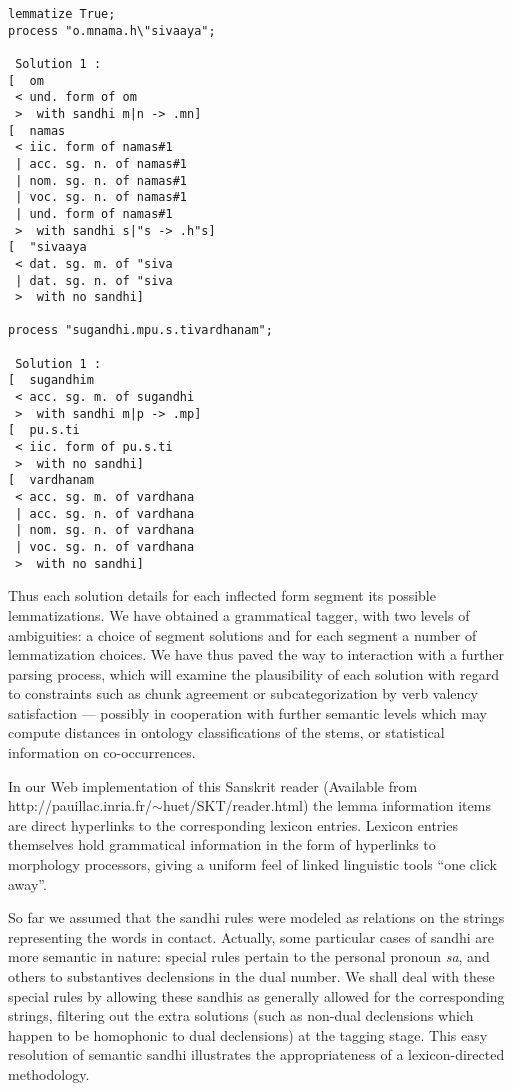 \begin{verbatim}
lemmatize True;
process "o.mnama.h\"sivaaya";

 Solution 1 :
[  om
 < und. form of om
 >  with sandhi m|n -> .mn]
[  namas
 < iic. form of namas#1
 | acc. sg. n. of namas#1
 | nom. sg. n. of namas#1
 | voc. sg. n. of namas#1
 | und. form of namas#1
 >  with sandhi s|"s -> .h"s]
[  "sivaaya
 < dat. sg. m. of "siva
 | dat. sg. n. of "siva
 >  with no sandhi]

process "sugandhi.mpu.s.tivardhanam";

 Solution 1 :
[  sugandhim
 < acc. sg. m. of sugandhi
 >  with sandhi m|p -> .mp]
[  pu.s.ti
 < iic. form of pu.s.ti
 >  with no sandhi]
[  vardhanam
 < acc. sg. m. of vardhana
 | acc. sg. n. of vardhana
 | nom. sg. n. of vardhana
 | voc. sg. n. of vardhana
 >  with no sandhi]
\end{verbatim}

Thus each solution details for each inflected form segment its possible
lemmatizations. We have obtained a grammatical tagger, with two levels of 
ambiguities: a choice of segment solutions and for each segment a number
of lemmatization choices. We have thus paved the way to interaction with
a further parsing process, which will examine the plausibility of
each solution with regard to constraints such as chunk agreement %
or subcategorization by verb valency
satisfaction --- possibly in cooperation with further semantic levels which
may compute distances in ontology classifications of the stems, or
statistical information on co-occurrences. 

In our Web implementation of this Sanskrit reader (Available
from http://pauillac.inria.fr/$\sim$huet/SKT/reader.html) the lemma 
information items are direct hyperlinks to the corresponding lexicon entries.
Lexicon entries themselves hold grammatical information in the form
of hyperlinks to morphology processors, giving a uniform feel of
linked linguistic tools ``one click away''.

So far we assumed that the sandhi rules were modeled as relations on
the strings representing the words in contact. Actually, some particular
cases of sandhi are more semantic in nature: special rules pertain to the
personal pronoun {\sl sa}, and others to substantives declensions in the
dual number. We shall deal with these special rules by allowing these sandhis
as generally allowed for the corresponding strings, filtering out the 
extra solutions (such as non-dual declensions which happen to be homophonic
to dual declensions) at the tagging stage. This easy resolution of semantic
sandhi illustrates the appropriateness of a lexicon-directed methodology.

